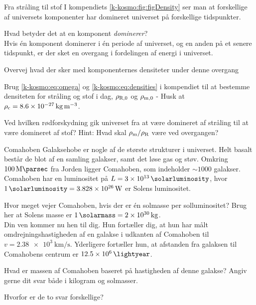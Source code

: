 \documentclass[crop=false, class=memoir]{standalone}
\begin{document}
\begin{opgave}[4]{Fra stråling til stof}
I kompendiets \cref{k-kosmo:fig:figDensity} ser man at forskellige af universets komponenter har domineret universet på forskellige tidspunkter. 

\opg Hvad betyder det at en komponent \emph{dominerer}? \\

Hvis én komponent dominerer i én periode af universet, og en anden på et senere tidspunkt, er der sket en overgang i fordelingen af energi i universet.

\opg Overvej hvad der sker med komponenternes densiteter under denne overgang

\opg Brug \cref{k-kosmo:eq:omega} og \cref{k-kosmo:eq:densities} i kompendiet til at bestemme densiteten for stråling og stof i dag, $\rho_{\textup{R},0}$ og $\rho_{\textup{m},0}$ - Husk at $\rho_\textup{c} = \SI{8,6e-27}{\kilogram \per \cubic \meter}$.

\opg Ved hvilken rødforskydning gik universet fra at være domineret af stråling til at være domineret af stof? Hint: Hvad skal ${\rho_\textup{m}}/{\rho_\textup{R}}$ være ved overgangen?

\end{opgave}

\begin{opgave}[2]{Comahoben}
Galaksehobe er nogle af de største strukturer i universet. Helt basalt består de blot af en samling galakser, samt det løse gas og støv. Omkring $\SI{100}{\mega \parsec}$ fra Jorden ligger Comahoben, som indeholder $\sim\num{1000}$ galakser. 
%
Comahoben har en luminositet på $L = \SI{3e13}{\solarluminosity}$, hvor $\SI{1}{\solarluminosity} = \SI{3,828e26}{\watt}$ er Solens luminositet. 

\opg Hvor meget vejer Comahoben, hvis der er én solmasse per solluminositet? Brug her at Solens masse er $\SI{1}{\solarmass} = \SI{2e30}{\kilogram}$. \\

\indent Din ven kommer nu hen til dig. Hun fortæller dig, at hun har målt omdrejningshastigheden af en galakse i udkanten af Comahoben til $v = \SI{2,38e3}{\kilo \meter \per \second}$. Yderligere fortæller hun, at afstanden fra galaksen til Comahobens centrum er $\SI{12,5e6}{\lightyear}$.

\opg Hvad er massen af Comahoben baseret på hastigheden af denne galakse? Angiv gerne dit svar både i kilogram og solmasser.

\opg Hvorfor er de to svar forskellige?

\end{opgave}



\end{document}

